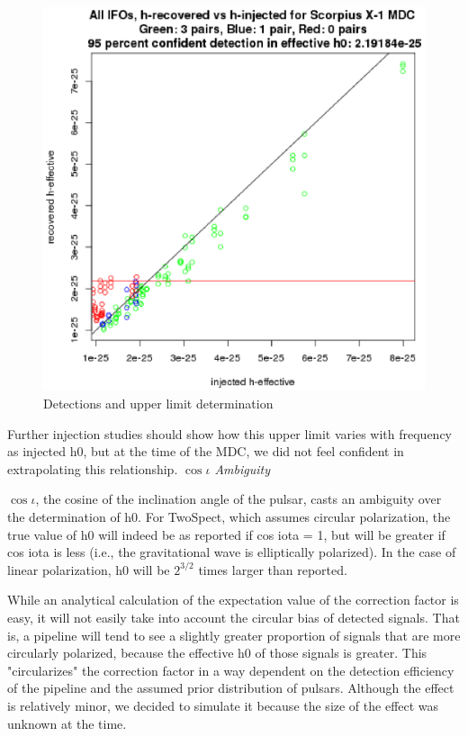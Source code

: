 \begin{figure}
\begin{center}
\includegraphics[width=0.3\paperwidth,height=0.2\paperheight]{HrecoveredVsHeffectiveFullUL.eps}
\caption{Detections and upper limit determination 
}
\end{center}
\end{figure}


Further injection studies should show how this upper limit varies with frequency as injected h0, but at the time of the MDC, we did not feel confident in extrapolating this relationship.
\newline
\textit{$\cos \iota$ Ambiguity}

$\cos \iota$, the cosine of the inclination angle of the pulsar, casts an ambiguity over the determination of h0. For TwoSpect, which assumes circular polarization, the true value of h0 will indeed be as reported if cos iota = 1, but will be greater if cos iota is less (i.e., the gravitational wave is elliptically polarized). In the case of linear polarization, h0 will be $2^{3/2}$ times larger than reported.

While an analytical calculation of the expectation value of the correction factor is easy, it will not easily take into account the circular bias of detected signals. That is, a pipeline will tend to see a slightly greater proportion of signals that are more circularly polarized, because the effective h0 of those signals is greater. This "circularizes" the correction factor in a way dependent on the detection efficiency of the pipeline and the assumed prior distribution of pulsars. Although the effect is relatively minor, we decided to simulate it because the size of the effect was unknown at the time.

